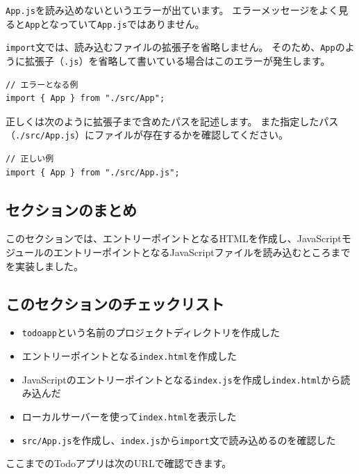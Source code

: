 \begin{description}
\texttt{App.js}を読み込めないというエラーが出ています。
エラーメッセージをよく見ると\texttt{App}となっていて\texttt{App.js}ではありません。

\texttt{import}文では、読み込むファイルの拡張子を省略しません。
そのため、\texttt{App}のように拡張子（\texttt{.js}）を省略して書いている場合はこのエラーが発生します。

\begin{lstlisting}
// エラーとなる例
import { App } from "./src/App";
\end{lstlisting}

正しくは次のように拡張子まで含めたパスを記述します。
また指定したパス（\texttt{./src/App.js}）にファイルが存在するかを確認してください。

\begin{lstlisting}
// 正しい例
import { App } from "./src/App.js";
\end{lstlisting}
\end{description}

\hypertarget{conclusion}{%
\subsection{セクションのまとめ}\label{conclusion}}

このセクションでは、エントリーポイントとなるHTMLを作成し、JavaScriptモジュールのエントリーポイントとなるJavaScriptファイルを読み込むところまでを実装しました。

\hypertarget{section-checklist}{%
\subsection{このセクションのチェックリスト}\label{section-checklist}}

\begin{itemize}
\item
  \texttt{todoapp}という名前のプロジェクトディレクトリを作成した
\item
  エントリーポイントとなる\texttt{index.html}を作成した
\item
  JavaScriptのエントリーポイントとなる\texttt{index.js}を作成し\texttt{index.html}から読み込んだ
\item
  ローカルサーバーを使って\texttt{index.html}を表示した
\item
  \texttt{src/App.js}を作成し、\texttt{index.js}から\texttt{import}文で読み込めるのを確認した
\end{itemize}

ここまでのTodoアプリは次のURLで確認できます。

